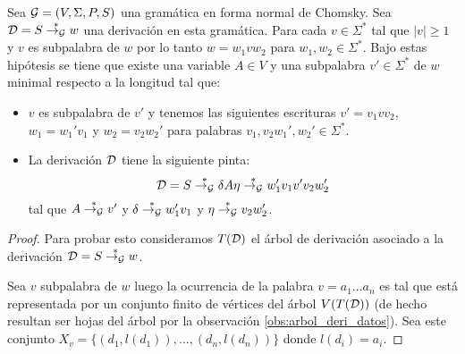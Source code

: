 \documentclass[tesis.tex]{subfiles}
\begin{document}
\begin{leoenv}

	\begin{lema}\label{lema:gram_ic_chomsky_variable_chica_deriva}
		Sea ${\cal G} = (V, \Sigma, P, S)$ una gramática \ic en forma normal de Chomsky.
		Sea ${\cal D} = S \overset{*}{\to_{\cal G}} w$ una derivación en esta gramática.
		Para cada $v \in \Sigma^{*}$ tal que $|v| \ge 1$ y $v$ es subpalabra de $w$ por lo tanto $w = w_{1}vw_{2}$ para $w_{1},w_{2} \in \Sigma^{*}$.
		Bajo estas hipótesis se tiene que existe una variable $A \in V$ y una subpalabra $v' \in \Sigma^{*}$ de $w$ minimal respecto a la longitud tal que:
		\begin{itemize}
			\item $v$ es subpalabra de $v'$ y tenemos las siguientes escrituras $v' = v_{1}vv_{2}$, $w_{1} = w_{1}'v_{1}$ y $w_{2} = v_{2}w_{2}'$ para palabras $v_{1},v_{2}w_{1}', w_{2}' \in \Sigma^{*}$.

			\item La derivación ${\cal D}$ tiene la siguiente pinta:
			\[
				{\cal D} = S \overset{*}{\to_{\cal G}} \delta A \eta \overset{*}{\to_{\cal G}} w_{1}'v_{1}v'v_{2}w_{2}'
			\]
			tal que $A \overset{*}{\to_{\cal G}} v'$ y $\delta \overset{*}{\to_{\cal G}} w_{1}'v_{1}$ y $\eta \overset{*}{\to_{\cal G}} v_{2}w_{2}'$.
		\end{itemize}

	\end{lema}
	\begin{proof}
		Para probar esto consideramos $T({\cal D})$ el árbol de derivación asociado a la derivación ${\cal D} = S \overset{*}{\to_{\cal G}} w$.

		Sea $v$ subpalabra de $w$ luego la ocurrencia de la palabra 
		$v = a_{1} \dots a_{n}$ es tal que está representada por un conjunto finito de vértices del árbol $V(T({\cal D}))$ (de hecho resultan ser hojas del árbol por la observación \ref{obs:arbol_deri_datos}).
		Sea este conjunto $X_{v}  = \{ (d_{1},l(d_{1})), \dots, (d_{n},l(d_{n})) \}$ donde $l(d_{i}) = a_{i}$.


\end{proof}
\end{leoenv}
\end{document}

